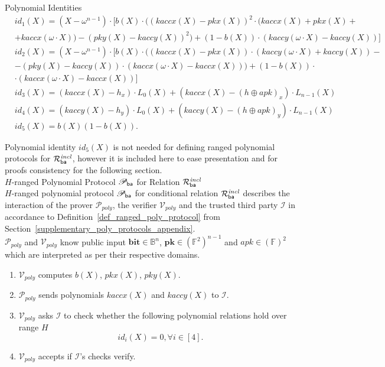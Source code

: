 \noindent \textsf{Polynomial Identities} 
\begin{align*}
& id_1(X) = (X-\omega^{n-1}) \cdot [b(X) \cdot ((kaccx(X)-pkx(X))^2 \cdot (kaccx(X)+ pkx(X) + \\ 
& + kaccx(\omega\cdot X)) - (pky(X) - kaccy(X))^2) +  (1-b(X))\cdot (kaccy(\omega\cdot X) - kaccy(X))] \\
& id_2(X)  =  (X-\omega^{n-1})\cdot [b(X) \cdot ((kaccx(X) - pkx(X)) \cdot (kaccy(\omega \cdot X) + kaccy(X)) - \\
& - (pky(X) - kaccy(X)) \cdot (kaccx(\omega \cdot X) - kaccx(X))) +  (1-b(X)) \cdot \\ 
& \cdot(kaccx(\omega \cdot X) - kaccx(X))] \\
& id_3(X)  =  (kaccx(X) - h_x)\cdot L_0(X) + (kaccx(X) - (h\oplus apk)_{x}) \cdot L_{n-1}(X)  \\
& id_4(X) =  (kaccy(X) - h_y)\cdot L_0(X) + (kaccy(X) - (h\oplus apk)_{y}) \cdot L_{n-1}(X) \\
& id_5(X) =  b(X)(1-b(X)).
\end{align*}

\noindent Polynomial identity $id_5(X)$ is not needed for defining ranged polynomial protocols for $\mathcal{R}^{\mathit{incl}}_{\mathsf{ba}}$, however it is included 
here to ease presentation and for proofs consistency for the following section. \\

\noindent \textsf{$H$-ranged Polynomial Protocol $\mathscr{P}_{\mathsf{ba}}$ for Relation $\mathcal{R}^{\mathit{incl}}_{\mathsf{ba}}$} \\

\noindent $H$-ranged polynomial protocol $\mathscr{P}_{\mathsf{ba}}$ for conditional relation $\mathcal{R}^{\mathit{incl}}_{\mathsf{ba}}$ describes the interaction of the prover 
$\mathcal{P}_{poly}$, the verifier $\mathcal{V}_{poly}$ and the trusted third party $\mathcal{I}$ in accordance to 
Definition~\ref{def_ranged_poly_protocol} from Section~\ref{supplementary_poly_protocols_appendix}. \\


\noindent $\mathcal{P}_{poly}$ and $\mathcal{V}_{poly}$ know public input 
$\mathbf{bit} \in \mathbb{B}^n$, $\mathbf{pk} \in (\mathbb{F}^2)^{n-1}$ and $\mathit{apk} \in (\mathbb{F})^2$ 
which are interpreted as per their respective domains.
\begin{enumerate}
\item $\mathcal{V}_{poly}$ computes $b(X)$, $pkx(X)$, $pky(X)$.
\item $\mathcal{P}_{poly}$ sends polynomials $kaccx(X)$ and $kaccy(X)$ to $\mathcal{I}$. 
\item $\mathcal{V}_{poly}$ asks $\mathcal{I}$ to check whether the following polynomial relations hold over range $H$ 
$$id_i(X) = 0, \forall i \in [4].$$
\item $\mathcal{V}_{poly}$  accepts if $\mathcal{I}$'s checks verify. 
\end{enumerate}

